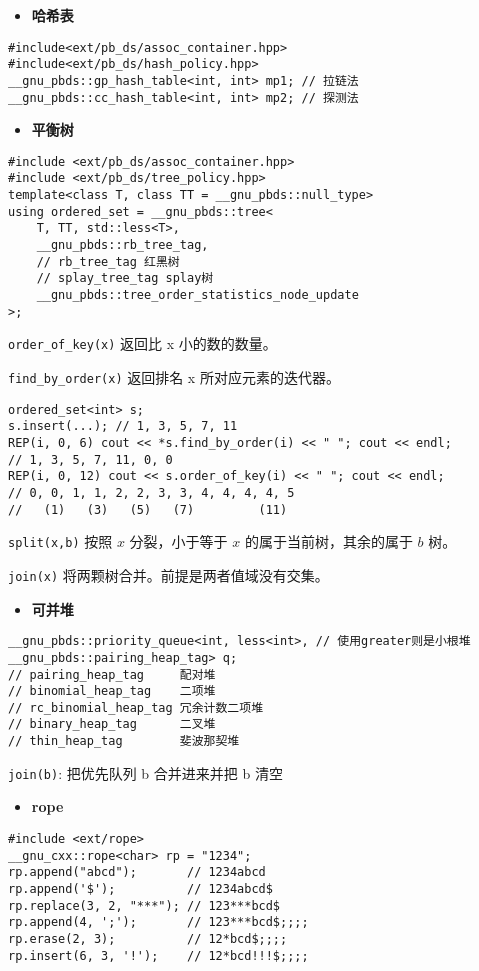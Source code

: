 \documentclass[a4paper,landscape,twocolumn]{ctexart}
\newcommand{\point}[1]{
	\begin{itemize}
		\item \textbf{#1}
	\end{itemize}
}
\begin{document}
\point{哈希表}

\begin{lstlisting}
#include<ext/pb_ds/assoc_container.hpp>
#include<ext/pb_ds/hash_policy.hpp>
__gnu_pbds::gp_hash_table<int, int> mp1; // 拉链法
__gnu_pbds::cc_hash_table<int, int> mp2; // 探测法
\end{lstlisting}

\point{平衡树}

\begin{lstlisting}
#include <ext/pb_ds/assoc_container.hpp>
#include <ext/pb_ds/tree_policy.hpp>
template<class T, class TT = __gnu_pbds::null_type>
using ordered_set = __gnu_pbds::tree<
	T, TT, std::less<T>,
	__gnu_pbds::rb_tree_tag,
	// rb_tree_tag 红黑树
	// splay_tree_tag splay树
	__gnu_pbds::tree_order_statistics_node_update
>;
\end{lstlisting}

\texttt{order\_of\_key(x)}  返回比 x 小的数的数量。

\texttt{find\_by\_order(x)}  返回排名 x 所对应元素的迭代器。

\begin{lstlisting}
ordered_set<int> s;
s.insert(...); // 1, 3, 5, 7, 11
REP(i, 0, 6) cout << *s.find_by_order(i) << " "; cout << endl;
// 1, 3, 5, 7, 11, 0, 0
REP(i, 0, 12) cout << s.order_of_key(i) << " "; cout << endl;
// 0, 0, 1, 1, 2, 2, 3, 3, 4, 4, 4, 4, 5
//   (1)   (3)   (5)   (7)         (11)
\end{lstlisting}

\texttt{split(x,b)} 按照 $x$ 分裂，小于等于 $x$ 的属于当前树，其余的属于 $b$ 树。

\texttt{join(x)} 将两颗树合并。前提是两者值域没有交集。

\point{可并堆}

\begin{lstlisting}
__gnu_pbds::priority_queue<int, less<int>, // 使用greater则是小根堆
__gnu_pbds::pairing_heap_tag> q;
// pairing_heap_tag     配对堆
// binomial_heap_tag    二项堆
// rc_binomial_heap_tag 冗余计数二项堆
// binary_heap_tag      二叉堆
// thin_heap_tag        斐波那契堆
\end{lstlisting}

\texttt{join(b)}: 把优先队列 b 合并进来并把 b 清空

\point{rope}

\begin{lstlisting}
#include <ext/rope>
__gnu_cxx::rope<char> rp = "1234";
rp.append("abcd");       // 1234abcd
rp.append('$');          // 1234abcd$
rp.replace(3, 2, "***"); // 123***bcd$
rp.append(4, ';');       // 123***bcd$;;;;
rp.erase(2, 3);          // 12*bcd$;;;;
rp.insert(6, 3, '!');    // 12*bcd!!!$;;;;
\end{lstlisting}
\end{document}
